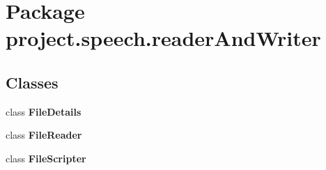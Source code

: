 \section{Package project.\+speech.\+reader\+And\+Writer}
\label{namespaceproject_1_1speech_1_1reader_and_writer}
\subsection*{Classes}
\begin{DoxyCompactItemize}
\item 
class {\bf File\+Details}
\item 
class {\bf File\+Reader}
\item 
class {\bf File\+Scripter}
\end{DoxyCompactItemize}
